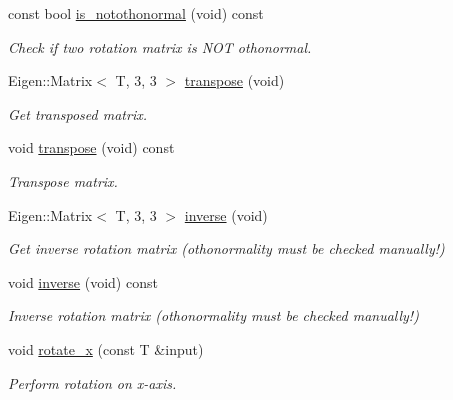 \begin{DoxyCompactItemize}
const bool \hyperlink{classddd_1_1rotation_a3b71f1f04257a2d519b0e5433d1ae4f3}{is\+\_\+notothonormal} (void) const
\begin{DoxyCompactList}\small\item\em Check if two rotation matrix is N\+OT othonormal. \end{DoxyCompactList}\item 
\mbox{\label{classddd_1_1rotation_ae20ad2dde12f552e8ef032e9e02733cf}} 
Eigen\+::\+Matrix$<$ T, 3, 3 $>$ \hyperlink{classddd_1_1rotation_ae20ad2dde12f552e8ef032e9e02733cf}{transpose} (void)
\begin{DoxyCompactList}\small\item\em Get transposed matrix. \end{DoxyCompactList}\item 
\mbox{\label{classddd_1_1rotation_aaeb56c20ff04304b991ae382dcd06829}} 
void \hyperlink{classddd_1_1rotation_aaeb56c20ff04304b991ae382dcd06829}{transpose} (void) const
\begin{DoxyCompactList}\small\item\em Transpose matrix. \end{DoxyCompactList}\item 
\mbox{\label{classddd_1_1rotation_ae27db71440b3473d16f3ffae6d963b31}} 
Eigen\+::\+Matrix$<$ T, 3, 3 $>$ \hyperlink{classddd_1_1rotation_ae27db71440b3473d16f3ffae6d963b31}{inverse} (void)
\begin{DoxyCompactList}\small\item\em Get inverse rotation matrix (othonormality must be checked manually!) \end{DoxyCompactList}\item 
\mbox{\label{classddd_1_1rotation_a6736628a6252a8373c567884f84c2f2d}} 
void \hyperlink{classddd_1_1rotation_a6736628a6252a8373c567884f84c2f2d}{inverse} (void) const
\begin{DoxyCompactList}\small\item\em Inverse rotation matrix (othonormality must be checked manually!) \end{DoxyCompactList}\item 
void \hyperlink{classddd_1_1rotation_af4bd213ca0cf7d372f840cbfd9d37696}{rotate\+\_\+x} (const T \&input)
\begin{DoxyCompactList}\small\item\em Perform rotation on x-\/axis. \end{DoxyCompactList}\item 

\end{DoxyCompactItemize}
